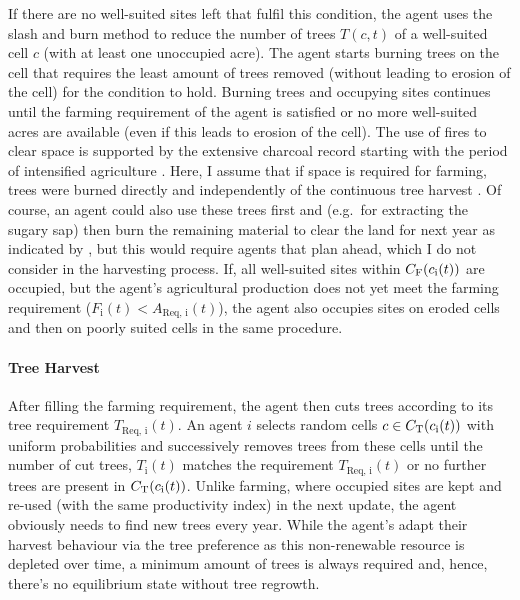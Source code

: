 If there are no well-suited sites left that fulfil this condition, the agent uses the slash and burn method to reduce the number of trees $T(c,t)$ of a well-suited cell $c$ (with at least one unoccupied acre).
The agent starts burning trees on the cell that requires the least amount of trees removed (without leading to erosion of the cell) for the condition to hold.
Burning trees and occupying sites continues until the farming requirement of the agent is satisfied or no more well-suited acres are available (even if this leads to erosion of the cell).
The use of fires to clear space is supported by the extensive charcoal record starting with the period of intensified agriculture \citep{Mieth2015}. 
Here, I assume that if space is required for farming, trees were burned directly and independently of the continuous tree harvest .
Of course, an agent could also use these trees first and (e.g.\ for extracting the sugary sap) then burn the remaining material to clear the land for next year as indicated by \citet{Mieth2015}, but this would require agents that plan ahead, which I do not consider in the harvesting process.
If, all well-suited sites within $C_{\rm F}(c_{\rm i}(t))$ are occupied, but the agent's agricultural production does not yet meet the farming requirement ($F_\text{i}(t)<A_\text{Req, i}(t)$), the agent also occupies sites on eroded cells and then on poorly suited cells in the same procedure.


\paragraph{Tree Harvest}
After filling the farming requirement, the agent then cuts trees according to its tree requirement $T_\text{Req, i}(t)$.
An agent $i$ selects random cells $c\in C_{\rm T}(c_{\rm i}(t))$ with uniform probabilities and successively removes trees from these cells until the number of cut trees, $T_\text{i}(t)$ matches the requirement $T_\text{Req, i}(t)$ or no further trees are present in $ C_{\rm T}(c_{\rm i}(t))$. 
Unlike farming, where occupied sites are kept and re-used (with the same productivity index) in the next update, the agent obviously needs to find new trees every year.
While the agent's adapt their harvest behaviour via the tree preference as this non-renewable resource is depleted over time, a minimum amount of trees is always required and, hence, there's no equilibrium state without tree regrowth.

